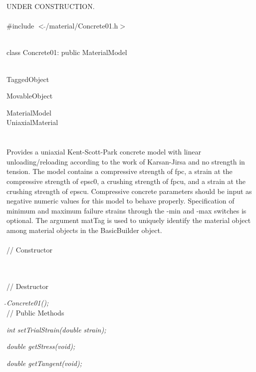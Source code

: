
UNDER CONSTRUCTION.\\

   \\
\#include $<\tilde{ }$/material/Concrete01.h$>$  


  \\
class Concrete01: public MaterialModel 


 \\
TaggedObject 

MovableObject 

\indent\indent MaterialModel \\
\indent\indent\indent UniaxialMaterial \\
\indent\indent\indent{} \\

  \\
\indent 
Provides a uniaxial Kent-Scott-Park concrete model with linear
unloading/reloading according to the work of Karsan-Jirsa and no
strength in tension. The model contains a compressive strength of fpc,
a strain at the compressive strength of epsc0, a crushing strength of
fpcu, and a strain at the crushing strength of epscu. Compressive
concrete parameters should be input as negative numeric values for
this model to behave properly. Specification of minimum and maximum
failure strains through the -min and -max switches is optional. The
argument matTag is used to uniquely identify the material object among
material objects in the BasicBuilder object. \\

 \\
// Constructor 

 \\ \\
// Destructor 

{\em $\tilde{ }$Concrete01();}\\ 

// Public Methods 

{\em int setTrialStrain(double strain); } 

{\em double getStress(void); } 

{\em double getTangent(void); } 

